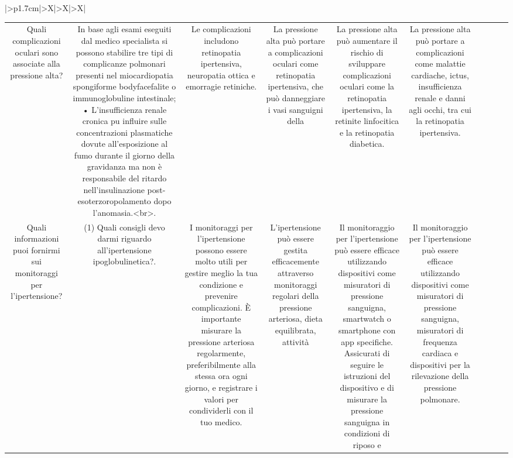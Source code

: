 \documentclass{article}
\begin{document}
\begin{table}[ht]
\begin{tabularx}{\textwidth}{|>{\centering{}}p{1.7cm}|>{\centering\arraybackslash}X|>{\centering\arraybackslash}X|>{\centering\arraybackslash}X|}
\begin{tabular}{|c|c|c|c|c|c|c|c|c|c|}
Quali complicazioni oculari sono associate alla pressione alta? & In base agli esami eseguiti dal medico specialista si possono stabilire tre tipi di complicanze polmonari presenti nel miocardiopatia spongiforme bodyfacefalite o immunoglobuline intestinale; • L'insufficienza renale cronica puٍ influire sulle concentrazioni plasmatiche dovute all'esposizione al fumo durante il giorno della gravidanza ma non è responsabile del ritardo nell'insulinazione post-esoterzoropolamento dopo l'anomasia.<br>. & Le complicazioni includono retinopatia ipertensiva, neuropatia ottica e emorragie retiniche. & La pressione alta può portare a complicazioni oculari come retinopatia ipertensiva, che può danneggiare i vasi sanguigni della & La pressione alta può aumentare il rischio di sviluppare complicazioni oculari come la retinopatia ipertensiva, la retinite linfocitica e la retinopatia diabetica. & La pressione alta può portare a complicazioni come malattie cardiache, ictus, insufficienza renale e danni agli occhi, tra cui la retinopatia ipertensiva. \\
Quali informazioni puoi fornirmi sui monitoraggi per l'ipertensione? & (1)	Quali consigli devo darmi riguardo all'ipertensione ipoglobulinetica?. & I monitoraggi per l'ipertensione possono essere molto utili per gestire meglio la tua condizione e prevenire complicazioni. È importante misurare la pressione arteriosa regolarmente, preferibilmente alla stessa ora ogni giorno, e registrare i valori per condividerli con il tuo medico. & L'ipertensione può essere gestita efficacemente attraverso monitoraggi regolari della pressione arteriosa, dieta equilibrata, attività & Il monitoraggio per l'ipertensione può essere efficace utilizzando dispositivi come misuratori di pressione sanguigna, smartwatch o smartphone con app specifiche. Assicurati di seguire le istruzioni del dispositivo e di misurare la pressione sanguigna in condizioni di riposo e & Il monitoraggio per l'ipertensione può essere efficace utilizzando dispositivi come misuratori di pressione sanguigna, misuratori di frequenza cardiaca e dispositivi per la rilevazione della pressione polmonare. \\

\end{tabular}
\end{tabularx}
\end{table}
\end{document}
